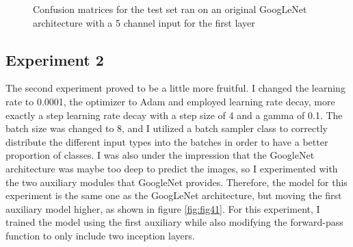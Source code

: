 \begin{figure}[!ht]
    \caption{Confusion matrices for the test set ran on an original GoogLeNet architecture with a 5 channel input for the first layer}
    \label{fig:fig9}
\end{figure}

\subsection{Experiment 2}

The second experiment proved to be a little more fruitful. I changed the learning rate to 0.0001, the optimizer to Adam and employed learning rate decay, more exactly a step learning rate decay with a step size of 4 and a gamma of 0.1. The batch size was changed to 8, and I utilized a batch sampler class to correctly distribute the different input types into the batches in order to have a better proportion of classes. I was also under the impression that the GoogleNet architecture was maybe too deep to predict the images, so I experimented with the two auxiliary modules that GoogleNet provides. Therefore, the model for this experiment is the same one as the GoogLeNet architecture, but moving the first auxiliary model higher, as shown in figure \ref{fig:fig41}. For this experiment, I trained the model using the first auxiliary while also modifying the forward-pass function to only include two inception layers.


